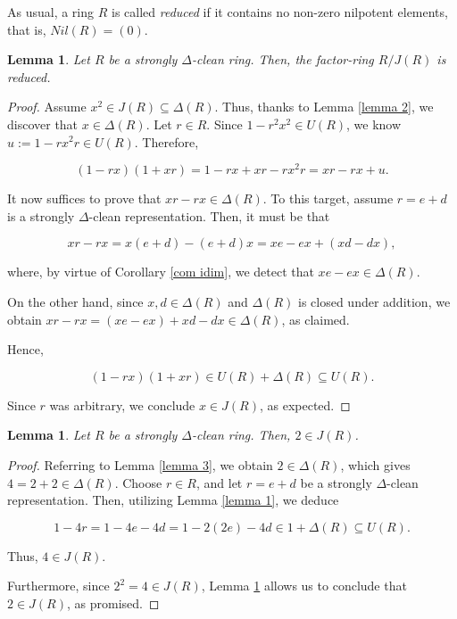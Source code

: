 \documentclass[12pt]{amsart}
\newtheorem{lemma}[theorem]{Lemma}
\theoremstyle{definition}
\begin{document}
As usual, a ring $R$ is called {\it reduced} if it contains no non-zero nilpotent elements, that is, $Nil(R)=(0)$.

\begin{lemma} \label{lemma 4}
Let \( R \) be a strongly $\Delta$-clean ring. Then, the factor-ring \( R/J(R) \) is reduced.
\end{lemma}

\begin{proof}
Assume \( x^2 \in J(R) \subseteq \Delta(R) \). Thus, thanks to Lemma \ref{lemma 2}, we discover that \( x \in \Delta(R) \). Let \( r \in R \). Since \( 1 - r^2x^2 \in U(R) \), we know \( u := 1 - rx^2r \in U(R) \). Therefore,

\[
(1 - rx)(1 + xr) = 1 - rx + xr - rx^2r = xr - rx + u.
\]

\medskip

It now suffices to prove that \( xr - rx \in \Delta(R) \). To this target, assume \( r = e + d \) is a strongly $\Delta$-clean representation. Then, it must be that

\[
xr - rx = x(e + d) - (e + d)x = xe - ex + (xd - dx),
\]

where, by virtue of Corollary \ref{com idim}, we detect that $xe - ex \in \Delta(R)$.

On the other hand, since $x, d \in \Delta(R)$ and $\Delta(R)$ is closed under addition, we obtain $xr - rx= (xe - ex) + xd - dx \in \Delta(R)$, as claimed.

Hence,

\[
(1 - rx)(1 + xr) \in U(R) + \Delta(R) \subseteq U(R).
\]

Since \( r \) was arbitrary, we conclude \( x \in J(R) \), as expected.
\end{proof}

\begin{lemma}\label{lemma 5}
Let \( R \) be a strongly $\Delta$-clean ring. Then, \( 2 \in J(R) \).
\end{lemma}

\begin{proof}
Referring to Lemma \ref{lemma 3}, we obtain \( 2 \in \Delta(R) \), which gives \( 4 = 2 + 2 \in \Delta(R) \). Choose \( r \in R \), and let \( r = e + d \) be a strongly $\Delta$-clean representation. Then, utilizing Lemma \ref{lemma 1}, we deduce

\[
1 - 4r = 1 - 4e - 4d = 1 - 2(2e) - 4d \in 1 + \Delta(R) \subseteq U(R).
\]

\medskip

Thus, \( 4 \in J(R) \).

Furthermore, since \( 2^2 =4 \in J(R) \), Lemma \ref{lemma 4} allows us to conclude that \( 2 \in J(R) \), as promised.
\end{proof}
\end{document}
